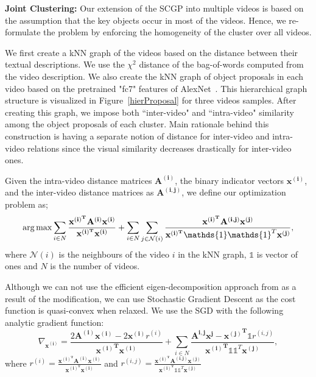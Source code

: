 \noindent\textbf{Joint Clustering:} Our extension of the SCGP into multiple videos is based on the assumption that the key objects occur in most of the videos. Hence, we re-formulate the problem by enforcing the homogeneity of the cluster over all videos.

We first create a kNN graph of the videos based on the distance between their textual descriptions. We use the $\chi^2$ distance of the bag-of-words computed from the video description. We also create the kNN graph of object proposals in each video based on the pretrained "fc7" features of AlexNet~\cite{alexnet}. This hierarchical graph structure is visualized in Figure~\ref{hierProposal} for three videos samples. After creating this graph, we impose both ``inter-video" and ``intra-video" similarity among the object proposals of each cluster. Main rationale behind this construction is having a separate notion of distance for inter-video and intra-video relations since the visual similarity decreases drastically for inter-video ones.

Given the intra-video distance matrices $\mathbf{A^{(i)}}$, the binary indicator vectors $\mathbf{x^{(i)}}$, and the inter-video distance matrices as $\mathbf{A^{(i,j)}}$, we define our optimization problem as;
\begin{equation}
\argmax \sum_{i \in N} \frac{\mathbf{x^{(i)^T}}\mathbf{A^{(i)}}\mathbf{x^{(i)}}}{\mathbf{x^{(i)^T}}\mathbf{x^{(i)}}} +
\sum_{i \in N} \sum_{j \in \mathcal{N}(i)} \frac{\mathbf{x^{(i)^T}}\mathbf{A^{(i,j)}}\mathbf{x^{(j)}}} {\mathbf{x^{(i)^T}}\mathds{1}\mathds{1}^T\mathbf{x^{(j)}}},
\end{equation}
where $\mathcal{N}(i)$ is the neighbours of the video $i$ in the kNN graph, $\mathds{1}$ is vector of ones and $N$ is the number of videos.

Although we can not use the efficient eigen-decomposition approach from \cite{scgp,scgp_eigen} as a result of the modification, we can use Stochastic Gradient Descent as the cost function is quasi-convex when relaxed. We use the SGD with the following analytic gradient function:
\begin{equation}
  \nabla_{\mathbf{x^{(i)}}} = \frac{2\mathbf{A^{(i)}} \mathbf{x^{(i)}} -2\mathbf{x^{(i)}} r^{(i)}}
  {\mathbf{{x^{(i)}}^T}\mathbf{x^{(i)}}}
+ \sum_{i \in N} \frac{\mathbf{A^{i,j}}\mathbf{x^{j}} - \mathbf{{x^{(j)}}^T} \mathds{1} r^{(i,j)}}{\mathbf{{x^{(i)}}^T} \mathds{1} \mathds{1}^T \mathbf{x^{(j)}} },
\end{equation}
where $r^{(i)}=\frac{\mathbf{x^{(i)^T}}\mathbf{A^{(i)}}\mathbf{x^{(i)}}}{\mathbf{x^{(i)^T}}\mathbf{x^{(i)}}}$ and $r^{(i,j)}=\frac{\mathbf{x^{(i)^T}}\mathbf{A^{(i,j)}}\mathbf{x^{(j)}}} {\mathbf{x^{(i)^T}}\mathds{1}\mathds{1}^T\mathbf{x^{(j)}}}$

